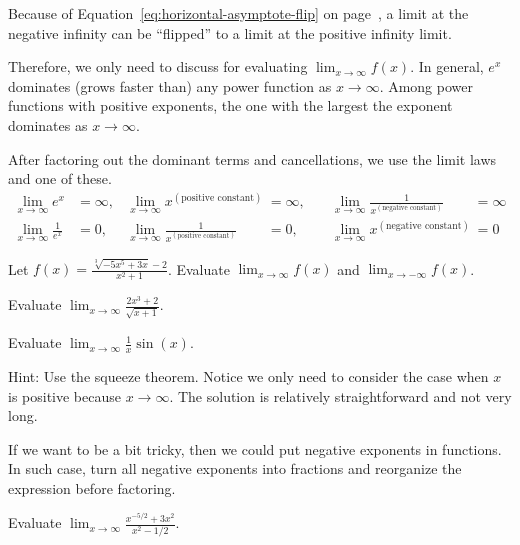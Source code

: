 \documentclass[../main.tex]{subfiles}
\begin{document}
  Because of Equation~\eqref{eq:horizontal-asymptote-flip} on page~\pageref{eq:horizontal-asymptote-flip}, a limit at the negative infinity can be ``flipped'' to a limit at the positive infinity limit. 

  Therefore, we only need to discuss  for evaluating \(\lim_{x \to \infty} f(x)\). In general, \(e^{x}\) dominates (grows faster than) any power function as \(x \to \infty\). Among power functions with positive exponents, the one with the largest the exponent dominates as \(x \to \infty\).

  After factoring out the dominant terms and cancellations, we use the limit laws and one of these.
  \begin{align*}
    \lim_{x \to \infty} e^{x} &= \infty, & \lim_{x \to \infty} x^{(\text{positive constant})} &= \infty, & \quad \lim_{x \to \infty} \frac{1}{x^{(\text{negative constant})}} &= \infty \\
    \lim_{x \to \infty} \frac{1}{e^{x}} &= 0, & \lim_{x \to \infty} \frac{1}{x^{(\text{positive constant})}} &= 0, & \quad \lim_{x \to \infty} x^{(\text{negative constant})} &= 0
  \end{align*}

  \begin{example}
    Let \(f(x) = \frac{\sqrt[3]{-5x^{5} + 3x} - 2}{x^{2} + 1}\). 
    Evaluate \(\lim_{x \to \infty} f(x)\) and \(\lim_{x \to -\infty} f(x)\). 

  \end{example}

  \begin{example}
    Evaluate \(\lim_{x \to \infty} \frac{2x^{3} + 2}{\sqrt{x + 1}}\).
  \end{example}
  \clearpage

  \begin{example}
    Evaluate \(\lim_{x \to \infty} \frac{1}{x} \sin(x)\).

    {\scriptsize Hint: Use the squeeze theorem. Notice we only need to consider the case when \(x\) is positive because \(x \to \infty\). The solution is relatively straightforward and not very long.}

  \end{example}

  If we want to be a bit tricky, then we could put negative exponents in functions.  In such case, turn all negative exponents into fractions and reorganize the expression before factoring.
  \begin{example}
    Evaluate \(\lim_{x \to \infty} \frac{x^{-5/2} + 3x^{2}}{x^{2} - 1/2}\). 
  \end{example}
\end{document}
